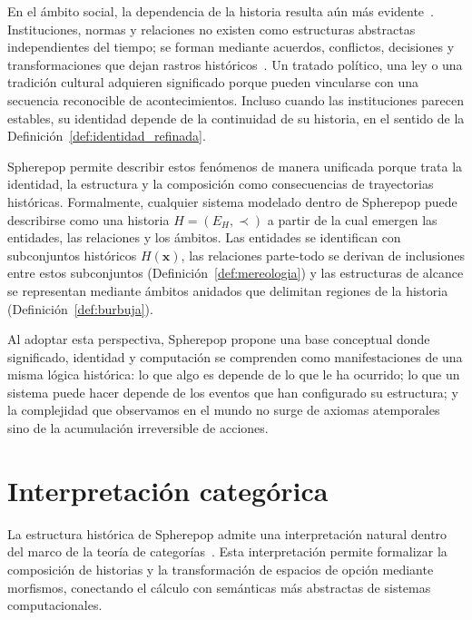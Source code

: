 \documentclass[12pt]{article}
\theoremstyle{plain}
\theoremstyle{definition}
\begin{document}
En el ámbito social, la dependencia de la historia resulta aún más evidente~\cite{searle,austin,goffman}. Instituciones, normas y relaciones no existen como estructuras abstractas independientes del tiempo; se forman mediante acuerdos, conflictos, decisiones y transformaciones que dejan rastros históricos~\cite{searle}. Un tratado político, una ley o una tradición cultural adquieren significado porque pueden vincularse con una secuencia reconocible de acontecimientos. Incluso cuando las instituciones parecen estables, su identidad depende de la continuidad de su historia, en el sentido de la Definición~\ref{def:identidad_refinada}.

Spherepop permite describir estos fenómenos de manera unificada porque trata la identidad, la estructura y la composición como consecuencias de trayectorias históricas. Formalmente, cualquier sistema modelado dentro de Spherepop puede describirse como una historia $H = (E_H, \prec)$ a partir de la cual emergen las entidades, las relaciones y los ámbitos. Las entidades se identifican con subconjuntos históricos $H(\mathbf{x})$, las relaciones parte-todo se derivan de inclusiones entre estos subconjuntos (Definición~\ref{def:mereologia}) y las estructuras de alcance se representan mediante ámbitos anidados que delimitan regiones de la historia (Definición~\ref{def:burbuja}).

Al adoptar esta perspectiva, Spherepop propone una base conceptual donde significado, identidad y computación se comprenden como manifestaciones de una misma lógica histórica: lo que algo es depende de lo que le ha ocurrido; lo que un sistema puede hacer depende de los eventos que han configurado su estructura; y la complejidad que observamos en el mundo no surge de axiomas atemporales sino de la acumulación irreversible de acciones.

\section{Interpretación categórica}
\label{sec:categorica}

La estructura histórica de Spherepop admite una interpretación natural dentro del marco de la teoría de categorías~\cite{maclane,awodey,jacobs}. Esta interpretación permite formalizar la composición de historias y la transformación de espacios de opción mediante morfismos, conectando el cálculo con semánticas más abstractas de sistemas computacionales.
\end{document}
